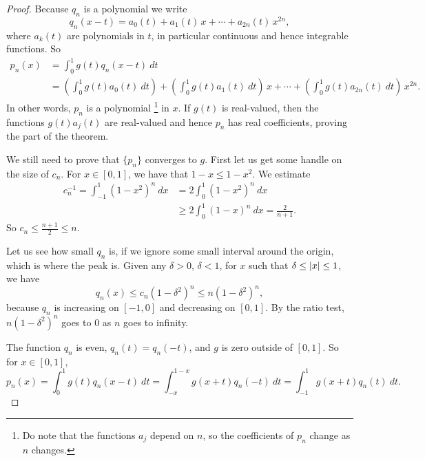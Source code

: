 \begin{proof}
Because $q_n$ is a polynomial we write
\begin{equation*}
q_n(x-t) = a_0(t) + a_1(t)\,x + \cdots + a_{2n}(t)\, x^{2n} ,
\end{equation*}
where $a_k(t)$ are polynomials in $t$, in particular continuous and hence
integrable functions.
So
\begin{equation*}
\begin{split}
p_n(x) & =
\int_{0}^1 g(t)q_n(x-t) ~dt
\\
&=
\left(
\int_0^1
g(t)
a_0(t)~dt
\right)
+
\left(
\int_0^1
g(t)
a_1(t)~dt
\right)
\,
x
+
\cdots
+
\left(
\int_0^1
g(t)
a_{2n}(t)~dt
\right)
\,
x^{2n} .
\end{split}
\end{equation*}
In other words, $p_n$ is a polynomial%
\footnote{%
Do note that the functions $a_j$ depend on $n$, so the coefficients of $p_n$
change as $n$ changes.}
 in $x$.
If $g(t)$ is real-valued, then the functions $g(t)a_j(t)$ are
real-valued and hence $p_n$ has real coefficients,
proving the  part of the theorem.

We still need to prove that $\{ p_n \}$ converges to $g$.  First let us
get some handle on the size of $c_n$.
For $x \in [0,1]$, we have that $1-x \leq 1-x^2$.  We estimate
\begin{equation*}
\begin{split}
c_n^{-1}   = \int_{-1}^1 {(1-x^2)}^n ~ dx
& = 2\int_0^1 {(1-x^2)}^n ~ dx \\
& \geq 2\int_0^{1} {(1-x)}^n ~ dx
= \frac{2}{n+1} .
\end{split}
\end{equation*}
So $c_n \leq \frac{n+1}{2} \leq n$.

Let us see how small $q_n$ is, if we ignore some small interval around the origin,
which is where the peak is.
Given any $\delta > 0$, $\delta < 1$, for
$x$ such that $\delta \leq \lvert {x} \rvert \leq 1$, we have
\begin{equation*}
q_n(x) \leq c_n {(1-\delta^2)}^n \leq  n{(1-\delta^2)}^n ,
\end{equation*}
because $q_n$ is increasing on $[-1,0]$ and decreasing on $[0,1]$.
By the ratio test, 
$n{(1-\delta^2)}^n$ goes to 0 as $n$ goes to infinity.

The function $q_n$ is even, $q_n(t) = q_n(-t)$, and $g$
is zero outside of $[0,1]$.
So for $x \in [0,1]$,
\begin{equation*}
p_n(x) = 
\int_{0}^1 g(t)q_n(x-t)  ~ dt
=
\int_{-x}^{1-x} g(x+t)q_n(-t)  ~ dt
=
\int_{-1}^{1} g(x+t)q_n(t)  ~ dt .
\end{equation*}


\end{proof}
